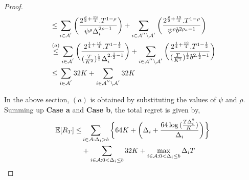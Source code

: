 \begin{proof}
\begin{align*}
&\leq\sum_{i\in \mathcal{A}^{'}}\bigg(\dfrac{2^{\frac{\rho}{2}+\frac{19}{4}}.T^{1-\rho } }{\psi^{\rho}\Delta_{i}^{2\rho -1}} \bigg)+\sum_{i\in \mathcal{A}^{''}\setminus \mathcal{A}^{'}}\bigg(\dfrac{2^{\frac{\rho}{2}+\frac{19}{4}}.T^{1-\rho} }{\psi^{\rho }b^{2\rho_{a}-1}} \bigg)\\
&\overset{(a)}{\leq}\sum_{i\in \mathcal{A}^{'}}\bigg(\dfrac{2^{\frac{1}{4}+\frac{19}{4}}.T^{1-\frac{1}{2} } }{(\frac{T}{K^2})^{\frac{1}{2}}\Delta_{i}^{2.\frac{1}{2} -1}} \bigg)+\sum_{i\in \mathcal{A}^{''}\setminus \mathcal{A}^{'}}\bigg(\dfrac{2^{\frac{1}{4}+\frac{19}{4}}.T^{1-\frac{1}{2}} }{(\frac{T}{K^2})^{\frac{1}{2} }b^{2.\frac{1}{2}-1}} \bigg)\\
&\leq\sum_{i\in \mathcal{A}^{'}}32 K +\sum_{i\in \mathcal{A}^{''}\setminus \mathcal{A}^{'}}32 K
\end{align*}

In the above section, $(a)$ is obtained by substituting the values of $\psi$ and $\rho$. Summing up \textbf{Case a} and \textbf{Case b}, the total regret is given by,
\begin{align*}
\mathbb{E} [R_{T}] \leq &\sum\limits_{i\in \mathcal{A} :\Delta_{i} > b}\bigg\lbrace 64 K + \bigg(\Delta_{i}+\dfrac{64\log{(\frac{T\Delta_{i}^{2}}{K})}}{\Delta_{i}}\bigg)\bigg \rbrace\\ 
  & +\sum\limits_{i\in \mathcal{A} :0 < \Delta_{i}\leq b} 32 K + \max_{i\in \mathcal{A} :0 < \Delta_{i}\leq b}\Delta_{i}T  
\end{align*}
\end{proof}




